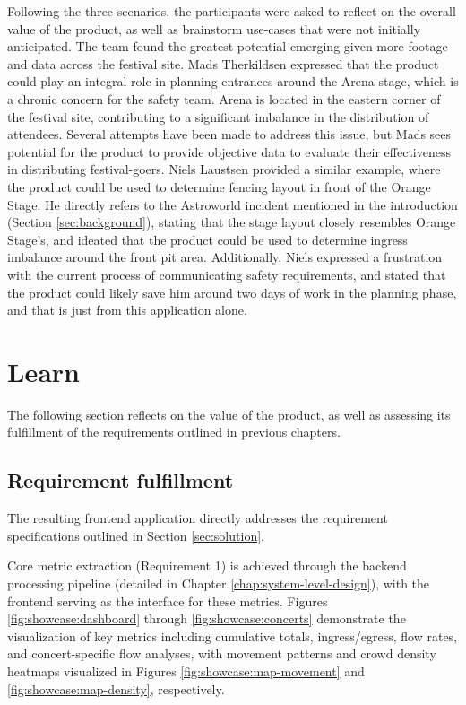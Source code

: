 Following the three scenarios, the participants were asked to reflect on the overall value of the product, as well as brainstorm use-cases that were not initially anticipated. The team found the greatest potential emerging given more footage and data across the festival site. Mads Therkildsen expressed that the product could play an integral role in planning entrances around the Arena stage, which is a chronic concern for the safety team. Arena is located in the eastern corner of the festival site, contributing to a significant imbalance in the distribution of attendees. Several attempts have been made to address this issue, but Mads sees potential for the product to provide objective data to evaluate their effectiveness in distributing festival-goers. Niels Laustsen provided a similar example, where the product could be used to determine fencing layout in front of the Orange Stage. He directly refers to the Astroworld incident mentioned in the introduction (Section \ref{sec:background}), stating that the stage layout closely resembles Orange Stage's, and ideated that the product could be used to determine ingress imbalance around the front pit area. Additionally, Niels expressed a frustration with the current process of communicating safety requirements, and stated that the product could likely save him around two days of work in the planning phase, and that is just from this application alone.

\section{Learn}

The following section reflects on the value of the product, as well as assessing its fulfillment of the requirements outlined in previous chapters.

\subsection{Requirement fulfillment}

The resulting frontend application directly addresses the requirement specifications outlined in Section \ref{sec:solution}.

Core metric extraction (Requirement 1) is achieved through the backend processing pipeline (detailed in Chapter \ref{chap:system-level-design}), with the frontend serving as the interface for these metrics. Figures \ref{fig:showcase:dashboard} through \ref{fig:showcase:concerts} demonstrate the visualization of key metrics including cumulative totals, ingress/egress, flow rates, and concert-specific flow analyses, with movement patterns and crowd density heatmaps visualized in Figures \ref{fig:showcase:map-movement} and \ref{fig:showcase:map-density}, respectively.

